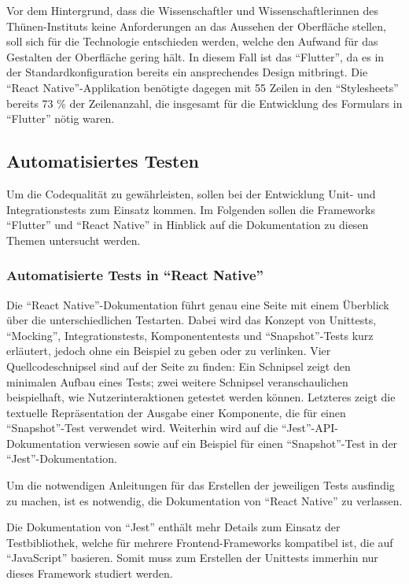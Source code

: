 Vor dem Hintergrund,
dass die Wissenschaftler und Wissenschaftlerinnen des Thünen-Instituts keine Anforderungen an das Aussehen der Oberfläche stellen,
soll sich für die Technologie entschieden werden,
welche den Aufwand für das Gestalten der Oberfläche gering hält.
In diesem Fall ist das \enquote{Flutter},
da es in der Standardkonfiguration bereits ein ansprechendes Design mitbringt.
Die \enquote{React Native}-Applikation benötigte dagegen mit 55 Zeilen in den \enquote{Stylesheets} bereits 73 \% der Zeilenanzahl,
die insgesamt für die Entwicklung des Formulars in \enquote{Flutter} nötig waren.

 


\subsection{Automatisiertes Testen}

Um die Codequalität zu gewährleisten,
sollen bei der Entwicklung Unit- und Integrationstests zum Einsatz kommen.
Im Folgenden sollen die Frameworks \enquote{Flutter} und \enquote{React Native} in Hinblick auf die Dokumentation zu diesen Themen untersucht werden. 


\subsubsection{Automatisierte Tests in \enquote{React Native}} Die \enquote{React Native}-Dokumentation führt genau eine Seite mit einem Überblick über die unterschiedlichen Testarten.
Dabei wird das Konzept von Unittests, \enquote{Mocking}, Integrationstests, Komponententests und \enquote{Snapshot}-Tests kurz erläutert, jedoch ohne ein Beispiel zu geben oder zu verlinken.
Vier Quellcodeschnipsel sind auf der Seite zu finden: Ein Schnipsel zeigt den minimalen Aufbau eines Tests; zwei weitere Schnipsel veranschaulichen beispielhaft, wie Nutzerinteraktionen getestet werden können.
Letzteres zeigt die textuelle Repräsentation der Ausgabe einer Komponente, die für einen \enquote{Snapshot}-Test verwendet wird.
Weiterhin wird auf die \enquote{Jest}-API-Dokumentation verwiesen sowie auf ein Beispiel für einen \enquote{Snapshot}-Test in der \enquote{Jest}-Dokumentation.

Um die notwendigen Anleitungen für das Erstellen der jeweiligen Tests ausfindig zu machen, ist es notwendig, die Dokumentation von \enquote{React Native} zu verlassen.

Die Dokumentation von \enquote{Jest} enthält mehr Details zum Einsatz der Testbibliothek, welche für mehrere Frontend-Frameworks kompatibel ist,
die auf \enquote{JavaScript} basieren.
Somit muss zum Erstellen der Unittests immerhin nur dieses Framework studiert werden.

